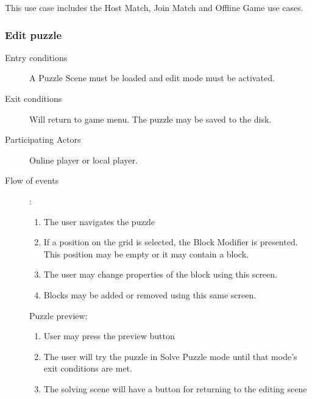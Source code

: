 \documentclass[12pt]{article}
\begin{document}
\begin{mdframed}
    This use case includes the Host Match, Join Match and Offline Game
    use cases.
    \subsubsection{Edit puzzle}
    \begin{description}
        \item[Entry conditions] A Puzzle Scene must be loaded and edit mode
            must be activated.
        \item[Exit conditions] Will return to game menu. The puzzle may be
            saved to the disk.
        \item[Participating Actors] Online player or local player.
        \item[Flow of events]:
            \begin{enumerate}
                \item The user navigates the puzzle
                \item If a position on the grid is selected, the Block Modifier
                    is presented. This position may be empty or it may
                    contain a block.
                \item The user may change properties of the block using this
                    screen.
                \item Blocks may be added or removed using this same screen.
            \end{enumerate}
            Puzzle preview:
            \begin{enumerate}
                \item User may press the preview button
                \item The user will try the puzzle in Solve Puzzle mode until
                    that mode's exit conditions are met.
                \item The solving scene will have a button for
                    returning to the editing scene
            \end{enumerate}
    \end{description}
\end{mdframed}
\end{document}
